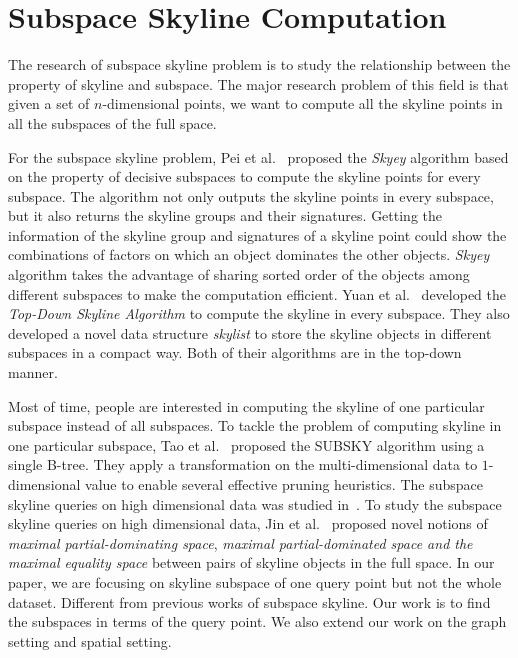 \section{Subspace Skyline Computation}
\label{sec:rel:subspace}
The research of subspace skyline problem is to study the relationship between the property of skyline and subspace. The major research problem of this field is that given a set of $n$-dimensional points, we want to compute all the skyline points in all the subspaces of the full space.

For the subspace skyline problem, Pei et al.~\cite{pei2005catching} proposed the \emph{Skyey} algorithm based on the property of decisive subspaces to compute the skyline points for every subspace.  The algorithm not only outputs the skyline points in every subspace, but it also returns the skyline groups and their signatures.
Getting the information of the skyline group and signatures of a skyline point could show the combinations of factors on which an object dominates the other objects. \emph{Skyey} algorithm takes the advantage of sharing sorted order of the objects among different subspaces to make the computation efficient. Yuan et al.~\cite{yuan2005efficient} developed the \emph{Top-Down Skyline Algorithm} to compute the skyline in every subspace. They also developed a novel data structure \emph{skylist} to store the skyline objects in different subspaces in a compact way. 
Both of their algorithms are in the top-down manner.

Most of time, people are interested in computing the skyline of one particular subspace instead of all subspaces. To tackle the problem of computing skyline in one particular subspace, Tao et al.~\cite{tao2006subsky} proposed the SUBSKY algorithm using a single B-tree. They apply a transformation on the multi-dimensional data to $1$-dimensional value to enable several effective pruning heuristics.
The subspace skyline queries on high dimensional data was studied in~\cite{jin2007efficient}. To study the subspace skyline queries on high dimensional data, Jin et al.~\cite{jin2007efficient} proposed novel notions of \emph{maximal partial-dominating space}, \emph{maximal partial-dominated space and the maximal equality space} between pairs of skyline objects in the full space. In our paper, we are focusing on skyline subspace of one query point but not the whole dataset. Different from previous works of subspace skyline. Our work is to find the subspaces in terms of the query point. We also extend our work on the graph setting and spatial setting.

